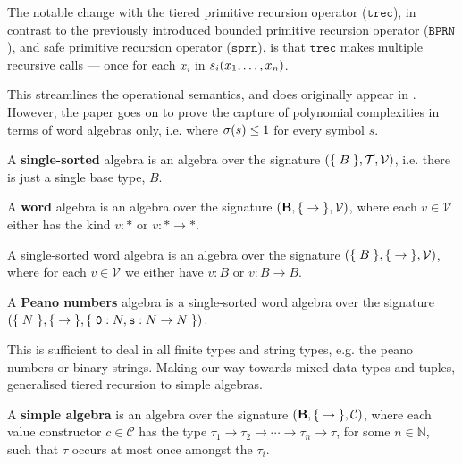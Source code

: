The notable change with the tiered primitive recursion operator
($\mathtt{trec}$), in contrast to the previously introduced bounded primitive
recursion operator ($\mathtt{BPRN}$), and safe primitive recursion operator
($\mathtt{sprn}$), is that $\mathtt{trec}$ makes multiple recursive calls ---
once for each $x_i$ in $s_i{\mathopen{}\left({x_1,\ldots,x_n}\right)\mathclose{}}$.

This streamlines the operational semantics, and does originally appear in
\cite{leivant-1995}. However, the paper goes on to prove the capture of
polynomial complexities in terms of word algebras only, i.e. where $\sigma{\ensuremath{\mathopen{}\left({s}\right)\mathclose{}}}
\leq 1$ for every symbol $s$.

\begin{definition} A \textbf{single-sorted} algebra is an algebra over the
signature ${\mathopen{}\left({\mathopen{}\left\{\mathrel{}{B}\mathrel{}\right\}\mathclose{}, \mathcal{T}, \mathcal{V}}\right)\mathclose{}}$, i.e. there is just a single
base type, $B$. \end{definition}

\begin{definition} A \textbf{word} algebra is an algebra over the signature
${\mathopen{}\left({\mathbf{B}, \mathopen{}\left\{\mathrel{}{\rightarrow}\mathrel{}\right\}\mathclose{}, \mathcal{V}}\right)\mathclose{}}$, where each $v \in
\mathcal{V}$ either has the kind $v : *$ or $v : *\rightarrow *$.
\end{definition}

\begin{example} A single-sorted word algebra is an algebra over the signature
${\mathopen{}\left({\mathopen{}\left\{\mathrel{}{B}\mathrel{}\right\}\mathclose{},\mathopen{}\left\{\mathrel{}{\rightarrow}\mathrel{}\right\}\mathclose{}, \mathcal{V}}\right)\mathclose{}}$, where for each $v \in
\mathcal{V}$ we either have $v : B$ or $v : B\rightarrow B$. \end{example}

\begin{definition} A \textbf{Peano numbers} algebra is a single-sorted word
algebra over the signature ${\mathopen{}\left({\mathopen{}\left\{\mathrel{}{N}\mathrel{}\right\}\mathclose{}, \mathopen{}\left\{\mathrel{}{\rightarrow}\mathrel{}\right\}\mathclose{},\mathopen{}\left\{\mathrel{}{\mathtt{0} : N,
\mathtt{s} : N \rightarrow N}\mathrel{}\right\}\mathclose{}}\right)\mathclose{}}$. \end{definition}


This is sufficient to deal in all finite types and string types, e.g.  the
peano numbers or binary strings. Making our way towards mixed data types and
tuples, \cite{marion-2003} generalised tiered recursion to simple algebras.

\begin{definition} A \textbf{simple algebra} is an algebra over the signature
${\mathopen{}\left({\mathbf{B}, \mathopen{}\left\{\mathrel{}{\rightarrow}\mathrel{}\right\}\mathclose{}, \mathcal{C}}\right)\mathclose{}}$, where each value constructor
$c \in \mathcal{C}$ has the type $\tau_1 \rightarrow \tau_2 \rightarrow \cdots
\rightarrow \tau_n \rightarrow \tau$, for some $n\in \mathbb{N}$, such that
$\tau$ occurs at most once amongst the $\tau_i$.  \end{definition}

